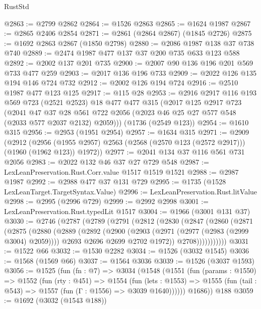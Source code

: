 \begin{lexlean}{RustStd}
\begin{coremodule}
@2863 := @2799 @2862
@2864 := @1526 @2863
@2865 := @1624 @1987
@2867 := @2865 @2406 @2854
@2871 := @2861 (@2864 @2867) (@1845 @2726)
@2875 := @1692 @2863 @2867 (@1850 @2798)
@2880 := @2086 @1987 @138 @37 @738 @740
@2889 := @2474 @1987 @477 @137 @37 @200 @735 @633 @123 @588
@2892 := @2002 @137 @201 @735
@2900 := @2007 @90 @136 @196 @201 @569 @733 @477 @259
@2903 := @2017 @136 @196 @733
@2909 := @2022 @126 @135 @194 @146 @724 @732
@2912 := @2002 @126 @194 @724
@2916 := @2510 @1987 @477 @123 @125
@2917 := @115 @28
@2953 := @2916
    @2917
    @116
    @193
    @569
    @723
    (@2521 @2523)
    @18
    @477
    @477
    @315
    (@2017
      @125
      @2917
      @723
      (@2041
        @47
        @37
        @28
        @561
        @722
        @2056
        (@2023 @46 @25 @27 @577 @548 (@2033 @577 @2037 @2132) @2059)))
    (@1736 (@2549 @123))
@2954 := @1610 @315
@2956 := @2953 (@1951 @2954)
@2957 := @1634 @315
@2971 := @2909
    (@2912
      (@2956 (@1955 @2957) @2563 (@2568 (@2570 @123 (@2572 @2917))) (@1960 (@1962 @123)) @1972))
@2977 := @2041 @134 @37 @116 @561 @731 @2056
@2983 := @2022 @132 @46 @37 @27 @729 @548
@2987 := LexLeanPreservation.Rust.Corr.value @1517 @1519 @1521
@2988 := @2987 @1987
@2992 := @2988 @477 @37 @131 @729
@2995 := @1735 (@1528 LexLeanTarget.TargetSyntax.Value)
@2996 := LexLeanPreservation.Rust.litValue
@2998 := @2995 (@2996 @729)
@2999 := @2992 @2998
@3001 := LexLeanPreservation.Rust.typedLit @1517
@3004 := @1966 (@3001 @131 @37)
@3030 := @2746
    (@2787
      (@2789
        (@2791
          (@2812
            (@2830
              (@2847
                (@2860
                  (@2871
                    (@2875
                      (@2880
                        (@2889
                          (@2892
                            (@2900
                              (@2903 (@2971 (@2977 (@2983 (@2999 @3004) @2059))))
                              @2693
                              @2696
                              @2699
                              @2702
                              @1972))
                          @2708)))))))))))
@3031 := @1522 @66
@3032 := @1530 @2282
@3034 := @1526 (@3032 @1545)
@3036 := @1568 (@1569 @66)
@3037 := @1564 @3036
@3039 := @1526 (@3037 @1593)
@3056 := @1525
    (fun (fn : @7) =>
    @3034
      (@1548
        (@1551
          (fun (params : @1550) =>
          @1552
            (fun (rty : @451) =>
            @1554
              (fun (lets : @1553) =>
              @1555 (fun (tail : @543) => @1557 (fun (Γ : @1556) => @3039 @1640))))))
        @1686))
    @188
@3059 := @1692 (@3032 (@1543 @188))

\end{coremodule}
\end{lexlean}
